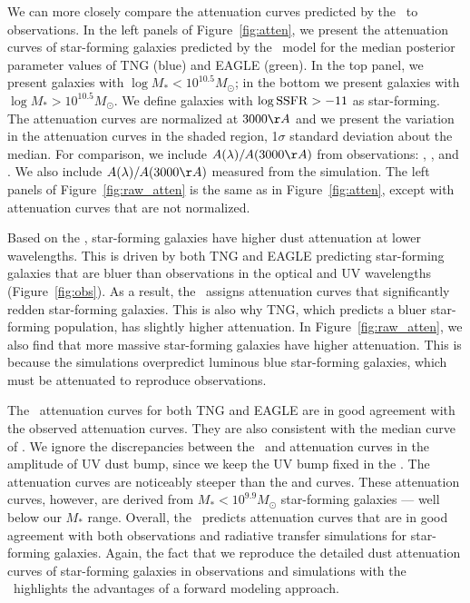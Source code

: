 We can more closely compare the attenuation curves predicted by the \eda~to 
observations. In the left panels of Figure~\ref{fig:atten}, we present the 
attenuation curves of star-forming galaxies predicted by the \eda~model for 
the median posterior parameter values of TNG (blue) and EAGLE (green). In 
the top panel, we present galaxies with $\log M_* < 10^{10.5} M_\odot$; in 
the bottom we present galaxies with $\log M_* > 10^{10.5} M_\odot$. We define
galaxies with $\log {\rm SSFR} > -11$ as star-forming. The attenuation curves 
are normalized at
$3000\AA$ and we present the variation in the attenuation curves in the shaded
region, 1$\sigma$ standard deviation about the median. For comparison,
we include $A(\lambda)/A(3000\AA)$ from observations: \cite{calzetti2000},
\cite{battisti2017}, and \cite{salim2018}. We also include $A(\lambda)/A(3000\AA)$
measured from the \cite{narayanan2018} simulation. The left panels of
Figure~\ref{fig:raw_atten} is the same as in Figure~\ref{fig:atten}, except
with attenuation curves that are not normalized. 

Based on the \eda, star-forming galaxies have higher dust attenuation at lower
wavelengths. This is driven by both TNG and EAGLE predicting star-forming
galaxies that are bluer than observations in the optical and UV wavelengths
(Figure~\ref{fig:obs}). As a result, the \eda~assigns attenuation curves that
significantly redden star-forming galaxies. This is also why TNG, which
predicts a bluer star-forming population, has slightly higher attenuation. 
In Figure~\ref{fig:raw_atten}, we also find that more massive star-forming
galaxies have higher attenuation. This is because the simulations overpredict 
luminous blue star-forming galaxies, which must be attenuated to reproduce
observations. 

The \eda~attenuation curves for both TNG and EAGLE are in good agreement with the
observed \cite{salim2018} attenuation curves. They are also consistent with the
median curve of \cite{narayanan2018}. We ignore the discrepancies between the
\eda~and \cite{narayanan2018} attenuation curves in the amplitude of UV dust
bump, since we keep the UV bump fixed in the \eda. The \eda attenuation curves 
are noticeably steeper than the \cite{calzetti2000} and \cite{battisti2017} curves. 
These attenuation curves, however, are derived from $M_* < 10^{9.9}M_\odot$ 
star-forming galaxies --- well below our $M_*$ range. %
Overall, the \eda~predicts attenuation curves that are in good agreement with 
both observations and radiative transfer simulations for star-forming galaxies. 
Again, the fact that we reproduce the detailed dust attenuation curves of star-forming 
galaxies in observations and simulations with the \eda~highlights the
advantages of a forward modeling approach. 


